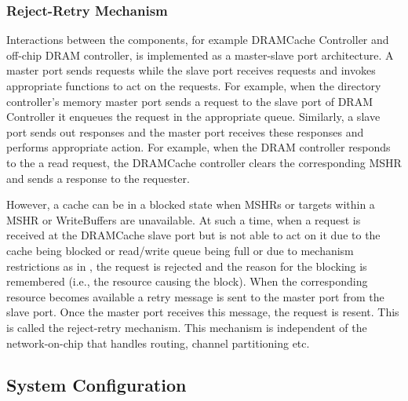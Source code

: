 \subsubsection{Reject-Retry Mechanism} Interactions between the components, for example DRAMCache Controller and off-chip DRAM controller, is implemented as a master-slave port architecture. A master port sends requests while the slave port receives requests and invokes appropriate functions to act on the requests. For example, when the directory controller's memory master port sends a request to the slave port of DRAM Controller it enqueues the request in the appropriate queue. Similarly, a slave port sends out responses and the master port receives these responses and performs appropriate action. For example, when the DRAM controller responds to the a read request, the DRAMCache controller clears the corresponding MSHR and sends a response to the requester.
\par However, a cache can be in a blocked state when MSHRs or targets within a MSHR or WriteBuffers are unavailable. At such a time, when a request is received at the DRAMCache slave port but is not able to act on it due to the cache being blocked or read/write queue being full or due to mechanism restrictions as in \prioname, the request is rejected and the reason for the blocking is remembered (i.e., the resource causing the block). When the corresponding resource becomes available a retry message is sent to the master port from the slave port. Once the master port receives this message, the request is resent. This is called the reject-retry mechanism. This mechanism is independent of the network-on-chip that handles routing, channel partitioning etc.

\subsection{System Configuration} 

